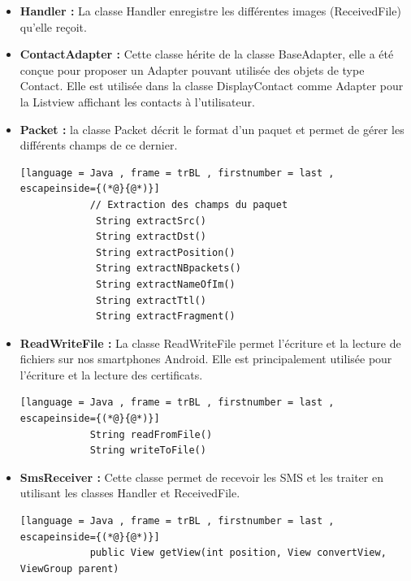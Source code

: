 \begin{itemize}
             
            \item \textbf{Handler :} La classe Handler enregistre les différentes images (ReceivedFile) qu'elle reçoit.
            \vspace{0.2cm}
            
            \item \textbf{ContactAdapter :} Cette classe hérite de la classe BaseAdapter, elle a été conçue pour proposer un Adapter pouvant utilisée des objets de type Contact. Elle est utilisée dans la classe DisplayContact comme Adapter pour la Listview affichant les contacts à l'utilisateur.
            \vspace{0.4cm}
            
            \item \textbf{Packet :} la classe Packet décrit le format d'un paquet et permet de gérer les différents champs de ce dernier.
            \begin{lstlisting}[language = Java , frame = trBL , firstnumber = last , escapeinside={(*@}{@*)}]
            // Extraction des champs du paquet
             String extractSrc()
             String extractDst()
             String extractPosition()
             String extractNBpackets()
             String extractNameOfIm()
             String extractTtl()
             String extractFragment()
            \end{lstlisting}
            \vspace{0.2cm}
            
            \item \textbf{ReadWriteFile :}
            La classe ReadWriteFile permet l'écriture et la lecture de fichiers sur nos smartphones Android. Elle est principalement utilisée pour l'écriture et la lecture des certificats.
             \begin{lstlisting}[language = Java , frame = trBL , firstnumber = last , escapeinside={(*@}{@*)}]
            String readFromFile()
            String writeToFile()
            \end{lstlisting}
            \vspace{0.2cm}
            
            \item \textbf{SmsReceiver :} Cette classe permet de recevoir les SMS et les traiter en utilisant les classes Handler et ReceivedFile.
            \vspace{0.2cm}
           
            \begin{lstlisting}[language = Java , frame = trBL , firstnumber = last , escapeinside={(*@}{@*)}]     
            public View getView(int position, View convertView, ViewGroup parent)
            \end{lstlisting}
            \vspace{0.2cm}
            

\end{itemize}
